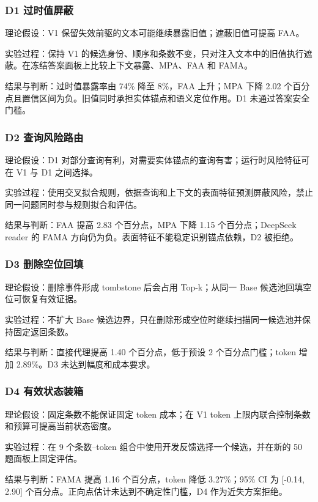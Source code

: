 \subsubsection{D1 过时值屏蔽}

理论假设：V1 保留失效前驱的文本可能继续暴露旧值；遮蔽旧值可提高 FAA。

实验过程：保持 V1 的候选身份、顺序和条数不变，只对注入文本中的旧值执行遮蔽。在冻结答案面板上比较上下文暴露、MPA、FAA 和 FAMA。

结果与判断：过时值暴露率由 74\% 降至 8\%，FAA 上升；MPA 下降 2.02 个百分点且置信区间为负。旧值同时承担实体锚点和语义定位作用。D1 未通过答案安全门槛。

\subsubsection{D2 查询风险路由}

理论假设：D1 对部分查询有利，对需要实体锚点的查询有害；运行时风险特征可在 V1 与 D1 之间选择。

实验过程：使用交叉拟合规则，依据查询和上下文的表面特征预测屏蔽风险，禁止同一问题同时参与规则拟合和评估。

结果与判断：FAA 提高 2.83 个百分点，MPA 下降 1.15 个百分点；DeepSeek reader 的 FAMA 方向仍为负。表面特征不能稳定识别锚点依赖，D2 被拒绝。

\subsubsection{D3 删除空位回填}

理论假设：删除事件形成 tombstone 后会占用 Top-k；从同一 Base 候选池回填空位可恢复有效证据。

实验过程：不扩大 Base 候选边界，只在删除形成空位时继续扫描同一候选池并保持固定返回条数。

结果与判断：直接代理提高 1.40 个百分点，低于预设 2 个百分点门槛；token 增加 2.89\%。D3 未达到幅度和成本要求。

\subsubsection{D4 有效状态装箱}

理论假设：固定条数不能保证固定 token 成本；在 V1 token 上限内联合控制条数和预算可提高当前状态密度。

实验过程：在 9 个条数--token 组合中使用开发反馈选择一个候选，并在新的 50 题面板上固定评估。

结果与判断：FAMA 提高 1.16 个百分点，token 降低 3.27\%；95\% CI 为 [-0.14, 2.90] 个百分点。正向点估计未达到不确定性门槛，D4 作为近失方案拒绝。

